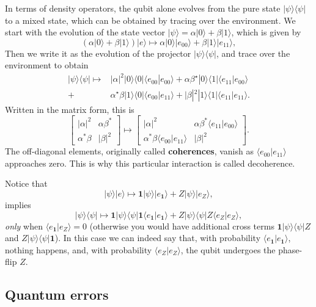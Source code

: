 \documentclass[fleqn]{article}
\begin{document}
In terms of density operators, the qubit alone evolves from the pure state \(|\psi\rangle\langle\psi|\) to a mixed state, which can be obtained by tracing over the environment.
We start with the evolution of the state vector \(|\psi\rangle=\alpha|0\rangle+\beta|1\rangle\), which is given by
\[
  \left( \alpha|0\rangle +\beta |1\rangle\right)|e\rangle \longmapsto
  \alpha |0\rangle|e_{00}\rangle +\beta |1\rangle |e_{11}\rangle,
\]
Then we write it as the evolution of the projector \(|\psi\rangle\langle\psi|\), and trace over the environment to obtain
\[
  \begin{aligned}
    |\psi\rangle\langle\psi| \longmapsto & |\alpha|^2|0\rangle\langle 0| \langle e_{00}|e_{00}\rangle+ \alpha\beta^\star |0\rangle\langle 1|\langle e_{11}|e_{00}\rangle
  \\+ &\alpha^\star\beta |1\rangle\langle 0|\langle e_{00}|e_{11}\rangle  + |\beta|^2|1\rangle\langle 1|\langle e_{11}|e_{11}\rangle.
  \end{aligned}
\]
Written in the matrix form, this is
\[
  \begin{bmatrix}
    |\alpha|^2 & \alpha\beta^\ast
  \\\alpha^\ast\beta & |\beta|^2
  \end{bmatrix}
  \longmapsto
  \begin{bmatrix}
    |\alpha|^2 & \alpha\beta^\ast \langle e_{11}|e_{00}\rangle
    \\\alpha^\ast\beta \langle e_{00}|e_{11}\rangle & |\beta|^2
  \end{bmatrix}.
\]
The off-diagonal elements, originally called \textbf{coherences}, vanish as \(\langle e_{00}|e_{11}\rangle\) approaches zero.
This is why this particular interaction is called decoherence.

Notice that
\[
|\psi\rangle|e\rangle \longmapsto \mathbf{1}|\psi\rangle|e_{\mathbf{1}}\rangle+Z|\psi\rangle|e_Z\rangle,
\]
implies
\[
|\psi\rangle\langle\psi|\longmapsto \mathbf{1}|\psi\rangle\langle\psi| \mathbf{1}\langle e_{\mathbf{1}}|e_{\mathbf{1}}\rangle +Z|\psi\rangle\langle\psi| Z\langle e_Z|e_Z\rangle,
\]
\emph{only} when \(\langle e_{\mathbf{1}}|e_Z\rangle=0\) (otherwise you would have additional cross terms \(\mathbf{1}|\psi\rangle\langle\psi| Z\) and \(Z|\psi\rangle\langle\psi| \mathbf{1}\)).
In this case we can indeed say that, with probability \(\langle e_{\mathbf{1}}|e_{\mathbf{1}}\rangle\), nothing happens, and, with probability \(\langle e_Z|e_Z\rangle\), the qubit undergoes the phase-flip \(Z\).

\hypertarget{quantum-errors}{%
\subsection{Quantum errors}\label{quantum-errors}}
\end{document}
